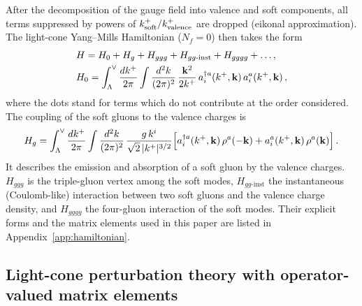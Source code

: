 After the decomposition of the gauge field into valence and soft components, all terms suppressed by powers of $k^+_{\rm soft}/k^+_{\rm valence}$ are dropped (eikonal approximation). The light-cone Yang--Mills Hamiltonian ($N_f=0$) then takes the form~\cite{Lublinsky:2016meo,Radhakrishnan:2026soft}
\begin{align}\label{eq:Hdecomp}
&H=H_0+H_g+H_{ggg}+H_{gg\text{-inst}}+H_{gggg}+\dots,\notag\\
&H_0=\int_\Lambda^\vee\frac{dk^+}{2\pi}\int\frac{d^2k}{(2\pi)^2}\,\frac{\mathbf{k}^2}{2k^+}\,a^{\dagger a}_i(k^+,\mathbf{k})\,a^a_i(k^+,\mathbf{k})\,,
\end{align}
where the dots stand for terms which do not contribute at the order considered. The coupling of the soft gluons to the valence charges is
\begin{align}\label{eq:Hg}
H_g=\int_\Lambda^\vee\frac{dk^+}{2\pi}\int\frac{d^2k}{(2\pi)^2}\,\frac{g\,k^i}{\sqrt2\,|k^+|^{3/2}}\Big[a^{\dagger a}_i(k^+,\mathbf{k})\,\rho^a(-\mathbf{k})+a^a_i(k^+,\mathbf{k})\,\rho^a(\mathbf{k})\Big]\,.
\end{align}
It describes the emission and absorption of a soft gluon by the valence charges. $H_{ggg}$ is the triple-gluon vertex among the soft modes, $H_{gg\text{-inst}}$ the instantaneous (Coulomb-like) interaction between two soft gluons and the valence charge density, and $H_{gggg}$ the four-gluon interaction of the soft modes. Their explicit forms and the matrix elements used in this paper are listed in Appendix~\ref{app:hamiltonian}.

\subsection{Light-cone perturbation theory with operator-valued matrix elements}\label{sec:lcpt}

